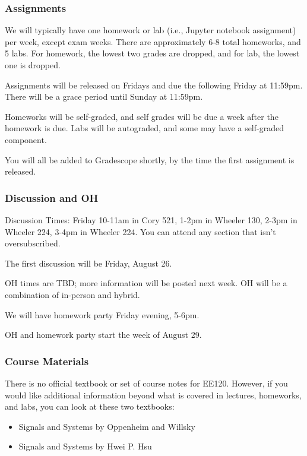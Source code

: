 \subsubsection{Assignments}

We will typically have one homework or lab (i.e., Jupyter notebook assignment) per week, except exam weeks. There are approximately 6-8 total homeworks, and 5 labs. For homework, the lowest two grades are dropped, and for lab, the lowest one is dropped.

Assignments will be released on Fridays and due the following Friday at 11:59pm. There will be a grace period until Sunday at 11:59pm.

Homeworks will be self-graded, and self grades will be due a week after the homework is due. Labs will be autograded, and some may have a self-graded component.

You will all be added to Gradescope shortly, by the time the first assignment is released.

\subsubsection{Discussion and OH}

Discussion Times: Friday 10-11am in Cory 521, 1-2pm in Wheeler 130, 2-3pm in Wheeler 224, 3-4pm in Wheeler 224. You can attend any section that isn't oversubscribed.

The first discussion will be Friday, August 26.

OH times are TBD; more information will be posted next week. OH will be a combination of in-person and hybrid. 

We will have homework party Friday evening, 5-6pm.

OH and homework party start the week of August 29.

\subsubsection{Course Materials}

There is no official textbook or set of course notes for EE120. However, if you would like additional information beyond what is covered in lectures, homeworks, and labs, you can look at these two textbooks:
\begin{itemize}
    \item Signals and Systems by Oppenheim and Willsky
    \item Signals and Systems by Hwei P. Hsu
\end{itemize}

